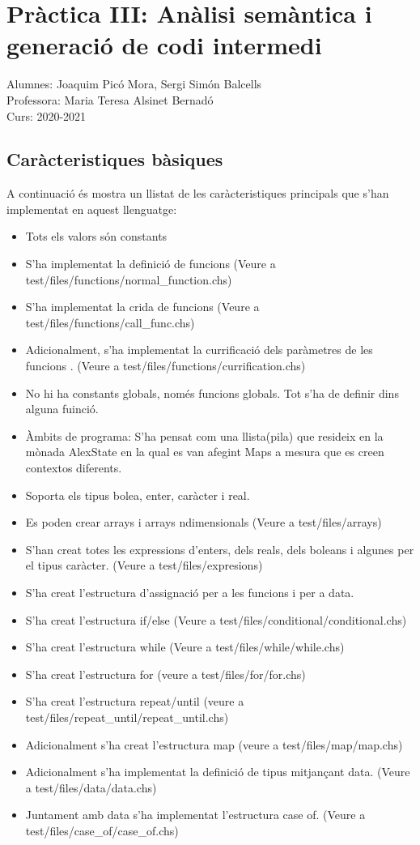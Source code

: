 \documentclass{article}
\begin{document}
\section{Pràctica III: Anàlisi semàntica i generació de codi intermedi}
Alumnes: Joaquim Picó Mora, Sergi Simón Balcells\\
Professora: Maria Teresa Alsinet Bernadó\\
Curs: 2020-2021
\subsection{Caràcteristiques bàsiques}
A continuació és mostra un llistat de les caràcteristiques principals
que s'han implementat en aquest llenguatge: 
\begin{itemize}
\item Tots els valors són constants 
\item S'ha implementat la definició de funcions (Veure a test/files/functions/normal\_function.chs) 
\item S'ha implementat la crida de funcions (Veure a test/files/functions/call\_func.chs) 
\item Adicionalment, s'ha implementat la currificació dels paràmetres de les funcions . (Veure a test/files/functions/currification.chs)
\item No hi ha constants globals, només funcions globals. Tot s'ha de definir dins alguna fuinció. 
\item Àmbits de programa: S'ha pensat com una llista(pila) que resideix en la mònada AlexState en la qual es van afegint Maps a mesura que es creen contextos diferents. 
\item Soporta els tipus bolea, enter, caràcter i real. 
\item Es poden crear arrays i arrays ndimensionals (Veure a test/files/arrays) 
\item S'han creat totes les expressions d'enters, dels reals, dels boleans i algunes per el tipus caràcter. (Veure a test/files/expresions) 
\item S'ha creat l'estructura d'assignació per a les funcions i per a data. 
\item S'ha creat l'estructura if/else (Veure a test/files/conditional/conditional.chs) 
\item S'ha creat l'estructura while (Veure a test/files/while/while.chs) 
\item S'ha creat l'estructura for (veure a test/files/for/for.chs)
\item S'ha creat l'estructura repeat/until (veure a test/files/repeat\_until/repeat\_until.chs)
\item Adicionalment s'ha creat l'estructura map (veure a test/files/map/map.chs)
\item Adicionalment s'ha implementat la definició de tipus mitjançant data. (Veure a test/files/data/data.chs) 
\item Juntament amb data s'ha implementat l'estructura case of. (Veure a test/files/case\_of/case\_of.chs)
\end{itemize}
\end{document}
